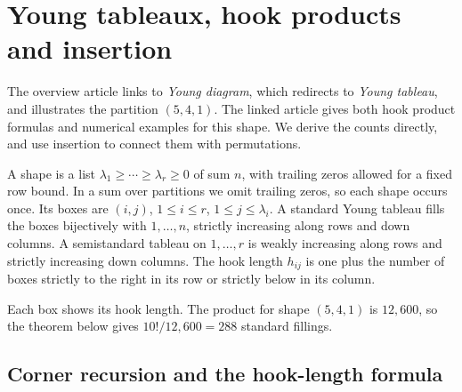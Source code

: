 \section{Young tableaux, hook products and insertion}
\label{sec:tableaux}

The overview article links to \emph{Young diagram}, which redirects to
\emph{Young tableau}, and illustrates the partition \((5,4,1)\). The
linked article gives both hook product formulas and numerical examples
for this shape. We derive the counts directly, and use insertion to
connect them with permutations.

A shape is a list \(\lambda_1\ge\cdots\ge\lambda_r\ge0\) of sum \(n\),
with trailing zeros allowed for a fixed row bound. In a sum over partitions
we omit trailing zeros, so each shape occurs once. Its boxes are \((i,j)\), \(1\le i\le r\),
\(1\le j\le\lambda_i\). A standard Young tableau fills the boxes
bijectively with \(1,\ldots,n\), strictly increasing along rows and
down columns. A semistandard tableau on \(1,\ldots,r\) is weakly
increasing along rows and strictly increasing down columns. The hook
length \(h_{ij}\) is one plus the number of boxes strictly to the
right in its row or strictly below in its column.

\begin{center}
\begin{minipage}{.32\linewidth}\centering
{}
\end{minipage}\begin{minipage}{.58\linewidth}\small
Each box shows its hook length. The product for shape $(5,4,1)$ is $12{,}600$, so the theorem below gives $10!/12{,}600=288$ standard fillings.
\end{minipage}
\end{center}

\subsection{Corner recursion and the hook-length formula}

